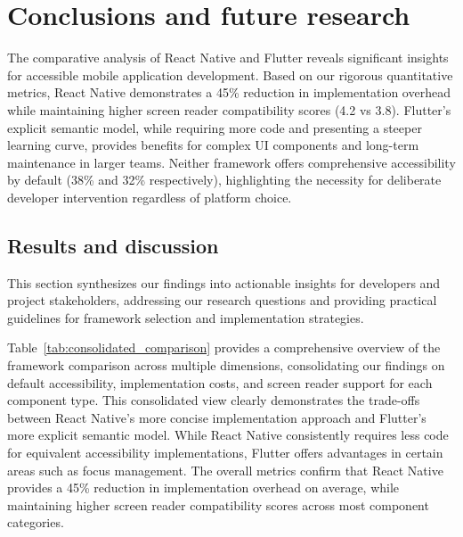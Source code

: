 \chapter{Conclusions and future research}
\label{chap:conclusions}

The comparative analysis of React Native and Flutter reveals significant insights for accessible mobile application development. Based on our rigorous quantitative metrics, React Native demonstrates a 45\% reduction in implementation overhead while maintaining higher screen reader compatibility scores (4.2 vs 3.8). Flutter's explicit semantic model, while requiring more code and presenting a steeper learning curve, provides benefits for complex UI components and long-term maintenance in larger teams. Neither framework offers comprehensive accessibility by default (38\% and 32\% respectively), highlighting the necessity for deliberate developer intervention regardless of platform choice.

\section{Results and discussion}
\label{sec:results-discussion}

This section synthesizes our findings into actionable insights for developers and project stakeholders, addressing our research questions and providing practical guidelines for framework selection and implementation strategies.

Table~\ref{tab:consolidated_comparison} provides a comprehensive overview of the framework comparison across multiple dimensions, consolidating our findings on default accessibility, implementation costs, and screen reader support for each component type. This consolidated view clearly demonstrates the trade-offs between React Native's more concise implementation approach and Flutter's more explicit semantic model. While React Native consistently requires less code for equivalent accessibility implementations, Flutter offers advantages in certain areas such as focus management. The overall metrics confirm that React Native provides a 45\% reduction in implementation overhead on average, while maintaining higher screen reader compatibility scores across most component categories.

